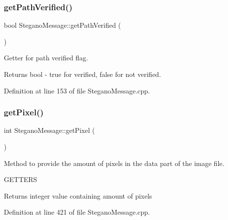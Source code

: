 \subsubsection{\texorpdfstring{getPathVerified()}{getPathVerified()}}
{\footnotesize\ttfamily bool Stegano\+Message\+::get\+Path\+Verified (\begin{DoxyParamCaption}{ }\end{DoxyParamCaption})}



Getter for path verified flag. 

\begin{DoxyReturn}{Returns}
bool -\/ true for verified, false for not verified. 
\end{DoxyReturn}


Definition at line 153 of file Stegano\+Message.\+cpp.

\mbox{\label{classSteganoMessage_a12231d3596b90fe4c6d67bd694b27d07}} 
\subsubsection{\texorpdfstring{getPixel()}{getPixel()}}
{\footnotesize\ttfamily int Stegano\+Message\+::get\+Pixel (\begin{DoxyParamCaption}{ }\end{DoxyParamCaption})\hspace{0.3cm}{\ttfamily [private]}}



Method to provide the amount of pixels in the data part of the image file. 

G\+E\+T\+T\+E\+RS\begin{DoxyReturn}{Returns}
integer value containing amount of pixels 
\end{DoxyReturn}


Definition at line 421 of file Stegano\+Message.\+cpp.

